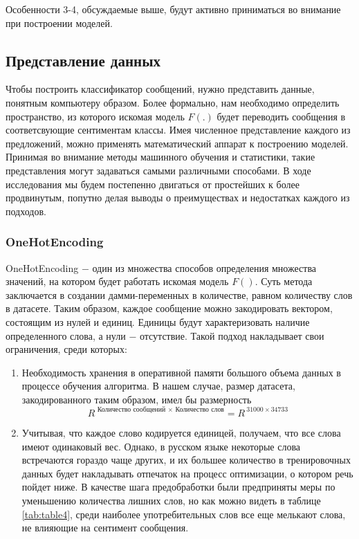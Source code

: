 \documentclass{article}
\begin{document}
Особенности 3-4, обсуждаемые выше, будут активно приниматься во внимание при построении моделей.

\subsection{Представление данных}
Чтобы построить классификатор сообщений, нужно представить данные, понятным компьютеру образом. Более формально, нам необходимо определить пространство, из которого искомая модель $F(.)$ будет переводить сообщения в соответсвующие сентиментам классы. Имея численное представление каждого из предложений, можно применять математический аппарат к построению моделей. Принимая во внимание методы машинного обучения и статистики, такие представления могут задаваться самыми различными способами. В ходе исследования мы будем постепенно двигаться от простейших к более продвинутым, попутно делая выводы о преимуществах и недостатках каждого из подходов.

\subsubsection{OneHotEncoding}

OneHotEncoding $-$ один из множества способов определения множества значений, на котором будет работать искомая модель $F()$. Суть метода заключается в создании дамми-переменных в количестве, равном количеству слов в датасете. Таким образом, каждое сообщение можно закодировать вектором, состоящим из нулей и единиц. Единицы будут характеризовать наличие определенного слова, а нули $-$ отсутствие. Такой подход накладывает свои ограничения, среди которых:

\begin{enumerate}
	\item Необходимость хранения в оперативной памяти большого объема данных в процессе обучения алгоритма. В нашем случае, размер датасета, закодированного таким образом, имел бы размерность \[R^{\text{ Количество сообщений }\times\text{ Количество слов}} = R^{~31000\times 34733}\]
	\item Учитывая, что каждое слово кодируется единицей, получаем, что все слова имеют одинаковый вес. Однако, в русском языке некоторые слова встречаются гораздо чаще других, и их большее количество в тренировочных данных будет накладывать отпечаток на процесс оптимизации, о котором речь пойдет ниже. В качестве шага предобработки были предприняты меры по уменьшению количества лишних слов, но как можно видеть в таблице \ref{tab:table4}, среди наиболее употребительных слов все еще мелькают слова, не влияющие на сентимент сообщения.
\end{enumerate}
\end{document}
